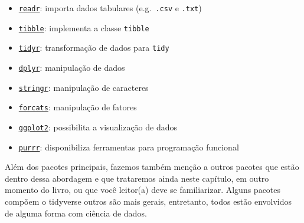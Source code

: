 \documentclass[
]{article}
\providecommand{\tightlist}{%
  \setlength{\itemsep}{0pt}\setlength{\parskip}{0pt}}
\begin{document}
\begin{itemize}
\tightlist
\item
  \href{https://readr.tidyverse.org/}{\texttt{readr}}: importa dados tabulares (e.g.~\texttt{.csv} e \texttt{.txt})
\item
  \href{https://tibble.tidyverse.org/}{\texttt{tibble}}: implementa a classe \texttt{tibble}
\item
  \href{https://tidyr.tidyverse.org/}{\texttt{tidyr}}: transformação de dados para \texttt{tidy}
\item
  \href{https://dplyr.tidyverse.org/}{\texttt{dplyr}}: manipulação de dados
\item
  \href{https://github.com/tidyverse/stringr}{\texttt{stringr}}: manipulação de caracteres
\item
  \href{https://github.com/hadley/forcats}{\texttt{forcats}}: manipulação de fatores
\item
  \href{https://ggplot2.tidyverse.org/}{\texttt{ggplot2}}: possibilita a visualização de dados
\item
  \href{https://purrr.tidyverse.org/}{\texttt{purrr}}: disponibiliza ferramentas para programação funcional
\end{itemize}

Além dos pacotes principais, fazemos também menção a outros pacotes que estão dentro dessa abordagem e que trataremos ainda neste capítulo, em outro momento do livro, ou que você leitor(a) deve se familiarizar. Alguns pacotes compõem o tidyverse outros são mais gerais, entretanto, todos estão envolvidos de alguma forma com ciência de dados.
\end{document}
